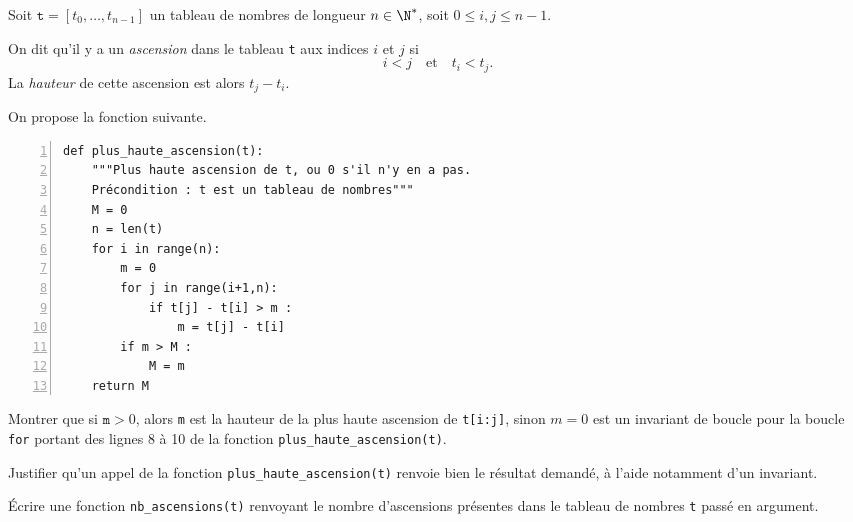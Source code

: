 Soit $\texttt{t} = [t_0,\dots,t_{n-1}]$ un tableau de nombres de longueur $n\in\N^\ast$, soit $0 \leq i,j \leq n-1$. 

On dit qu'il y a un \emph{ascension} dans le tableau \texttt{t} aux indices $i$ et $j$ si 
\begin{equation*}
  i < j \quad\textrm{et}\quad t_i < t_j. 
\end{equation*}
La \emph{hauteur} de cette ascension est alors $t_j - t_i$.

\bigskip{}

On propose la fonction suivante. 

\begin{Verbatim}[gobble=0,numbers=left]
def plus_haute_ascension(t):
    """Plus haute ascension de t, ou 0 s'il n'y en a pas.
    Précondition : t est un tableau de nombres"""
    M = 0
    n = len(t)
    for i in range(n):
        m = 0
        for j in range(i+1,n):
            if t[j] - t[i] > m :
                m = t[j] - t[i]
        if m > M :
            M = m
    return M
\end{Verbatim}

\bigskip{}

\question{} Montrer que \og si $\texttt{m}>0$, alors \texttt{m} est la hauteur de la plus haute ascension de \texttt{t[i:j]}, sinon $m=0$ \fg{} est un invariant de boucle pour la boucle \texttt{for} portant des lignes 8 à 10 de la fonction \texttt{plus\_haute\_ascension(t)}.

\medskip{} 

\question{} Justifier qu'un appel de la fonction \texttt{plus\_haute\_ascension(t)} renvoie bien le résultat demandé, à l'aide notamment d'un invariant.

\medskip{}

\question{} Écrire une fonction \texttt{nb\_ascensions(t)} renvoyant le nombre d'ascensions présentes dans le tableau de nombres \texttt{t} passé en argument. 